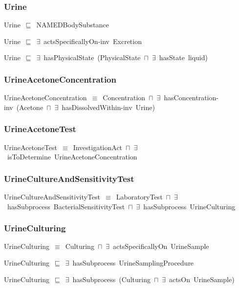 \documentclass{article}
\begin{document}
\subsubsection*{Urine}

Urine~\ensuremath{\sqsubseteq}~NAMEDBodySubstance~

Urine~\ensuremath{\sqsubseteq}~\ensuremath{\exists}~actsSpecificallyOn-inv~Excretion~

Urine~\ensuremath{\sqsubseteq}~\ensuremath{\exists}~hasPhysicalState~(PhysicalState~\ensuremath{\sqcap}~\ensuremath{\exists}~hasState~liquid)~

\subsubsection*{UrineAcetoneConcentration}

UrineAcetoneConcentration~\ensuremath{\equiv}~Concentration~\ensuremath{\sqcap}~\ensuremath{\exists}~hasConcentration-inv~(Acetone~\ensuremath{\sqcap}~\ensuremath{\exists}~hasDissolvedWithin-inv~Urine)

\subsubsection*{UrineAcetoneTest}

UrineAcetoneTest~\ensuremath{\equiv}~InvestigationAct~\ensuremath{\sqcap}~\ensuremath{\exists}~isToDetermine~UrineAcetoneConcentration

\subsubsection*{UrineCultureAndSensitivityTest}

UrineCultureAndSensitivityTest~\ensuremath{\equiv}~LaboratoryTest~\ensuremath{\sqcap}~\ensuremath{\exists}~hasSubprocess~BacterialSensitivityTest~\ensuremath{\sqcap}~\ensuremath{\exists}~hasSubprocess~UrineCulturing

\subsubsection*{UrineCulturing}

UrineCulturing~\ensuremath{\equiv}~Culturing~\ensuremath{\sqcap}~\ensuremath{\exists}~actsSpecificallyOn~UrineSample

UrineCulturing~\ensuremath{\sqsubseteq}~\ensuremath{\exists}~hasSubprocess~UrineSamplingProcedure~

UrineCulturing~\ensuremath{\sqsubseteq}~\ensuremath{\exists}~hasSubprocess~(Culturing~\ensuremath{\sqcap}~\ensuremath{\exists}~actsOn~UrineSample)~
\end{document}
